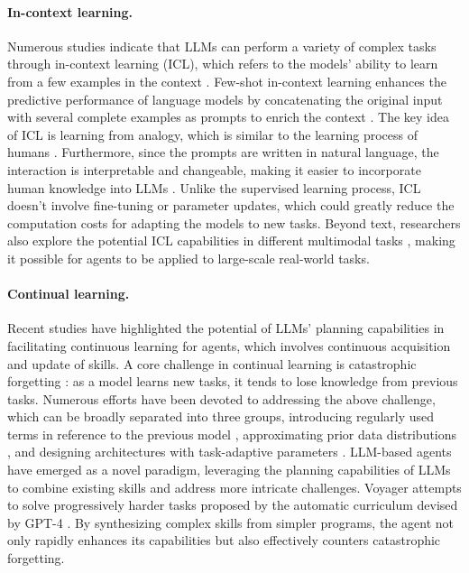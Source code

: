 \paragraph{In-context learning.}
Numerous studies indicate that LLMs can perform a variety of complex tasks through in-context learning (ICL), which refers to the models' ability to learn from a few examples in the context \cite{DBLP:journals/corr/abs-2301-00234}. Few-shot in-context learning enhances the predictive performance of language models by concatenating the original input with several complete examples as prompts to enrich the context \cite{DBLP:conf/nips/BrownMRSKDNSSAA20}. The key idea of ICL is learning from analogy, which is similar to the learning process of humans \cite{DBLP:journals/cacm/Winston80}. Furthermore, since the prompts are written in natural language, the interaction is interpretable and changeable, making it easier to incorporate human knowledge into LLMs \cite{DBLP:conf/nips/Wei0SBIXCLZ22, DBLP:conf/acl/LuBM0S22}. Unlike the supervised learning process, ICL doesn't involve fine-tuning or parameter updates, which could greatly reduce the computation costs for adapting the models to new tasks. Beyond text, researchers also explore the potential ICL capabilities in different multimodal tasks \cite{DBLP:conf/cvpr/WangWCS023,DBLP:journals/corr/abs-2301-02111, DBLP:conf/nips/TsimpoukelliMCE21, DBLP:conf/nips/BarGDGE22, DBLP:journals/corr/abs-2304-04675, DBLP:journals/corr/abs-2303-03926}, making it possible for agents to be applied to large-scale real-world tasks.

\paragraph{Continual learning.}
Recent studies \cite{DBLP:journals/corr/abs-2305-16291, zhang2023bootstrap} have highlighted the potential of LLMs' planning capabilities in facilitating continuous learning \cite{Ke2022ContinualLO, Wang2023ACS} for agents, which involves continuous acquisition and update of skills. 
A core challenge in continual learning is catastrophic forgetting \cite{McCloskey1989CatastrophicII}: as a model learns new tasks, it tends to lose knowledge from previous tasks. 
Numerous efforts have been devoted to addressing the above challenge, which can be broadly separated into three groups, introducing regularly used terms in reference to the previous model \cite{kirkpatrick2017overcoming, li2017learning, farajtabar2020orthogonal, smith2023continual}, approximating prior data distributions \cite{lopez2017gradient, de2019episodic, rolnick2019experience}, and designing architectures with task-adaptive parameters \cite{Serr2018OvercomingCF, razdaibiedina2023progressive}. 
LLM-based agents have emerged as a novel paradigm, leveraging the planning capabilities of LLMs to combine existing skills and address more intricate challenges. Voyager \cite{DBLP:journals/corr/abs-2305-16291} attempts to solve progressively harder tasks proposed by the automatic curriculum devised by GPT-4 \cite{DBLP:journals/corr/abs-2303-08774}. By synthesizing complex skills from simpler programs, the agent not only rapidly enhances its capabilities but also effectively counters catastrophic forgetting.



